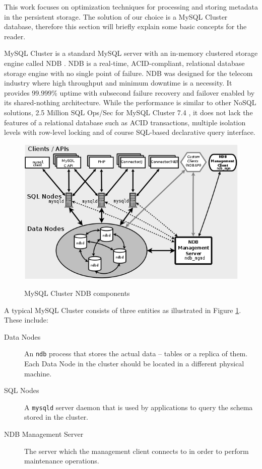This work focuses on optimization techniques for processing and
storing metadata in the persistent storage. The solution of our choice
is a MySQL Cluster database, therefore this section will briefly
explain some basic concepts for the reader.

MySQL Cluster is a standard MySQL server with an in-memory clustered
storage engine called NDB
\cite{Ronstrom:2005:RPM:1083592.1083720}. NDB is a real-time,
ACID-compliant, relational database storage engine with no single
point of failure. NDB was designed for the telecom industry where high
throughput and minimum downtime is a necessity. It provides $99.999\%$
uptime with subsecond failure recovery and failover enabled by its
shared-nothing architecture. While the performance is similar to other
NoSQL solutions, 2.5 Million SQL Ops/Sec for MySQL Cluster 7.4 \cite{ndb_benchmark},
it does not lack the features of a relational
database such as ACID transactions, multiple isolation levels with
row-level locking and of course SQL-based declarative query interface.

\begin{figure}
\centering
\includegraphics[scale=0.7]{resources/images/Background/ndb_arch.png}
\label{fig:ndb_ndb_arch}
\caption{MySQL Cluster NDB components \cite{ndb_components}}
\end{figure}

A typical MySQL Cluster consists of three entities as illustrated in
Figure \ref{fig:ndb_ndb_arch}. These include:
\begin{description}
\item[Data Nodes] An \texttt{ndb} process that stores the actual data
  -- tables or a
  replica of them. Each Data Node in the cluster should be located in a
  different physical machine.
\item[SQL Nodes] A \texttt{mysqld} server daemon that is used by
  applications to query the schema stored in the cluster.
\item[NDB Management Server] The server which the management client
  connects to in order to perform maintenance operations.
\end{description}

